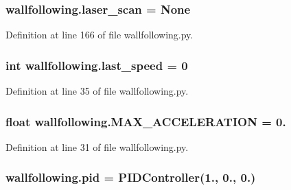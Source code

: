 \subsubsection[{\texorpdfstring{laser\+\_\+scan}{laser_scan}}]{\setlength{\rightskip}{0pt plus 5cm}wallfollowing.\+laser\+\_\+scan = None}\hypertarget{namespacewallfollowing_a35ff373c811db70d98205347a736c606}{}\label{namespacewallfollowing_a35ff373c811db70d98205347a736c606}


Definition at line 166 of file wallfollowing.\+py.

\subsubsection[{\texorpdfstring{last\+\_\+speed}{last_speed}}]{\setlength{\rightskip}{0pt plus 5cm}int wallfollowing.\+last\+\_\+speed = 0}\hypertarget{namespacewallfollowing_a9ee8d77a4629b5d8ecb2899da6e3a7fe}{}\label{namespacewallfollowing_a9ee8d77a4629b5d8ecb2899da6e3a7fe}


Definition at line 35 of file wallfollowing.\+py.

\subsubsection[{\texorpdfstring{M\+A\+X\+\_\+\+A\+C\+C\+E\+L\+E\+R\+A\+T\+I\+ON}{MAX_ACCELERATION}}]{\setlength{\rightskip}{0pt plus 5cm}float wallfollowing.\+M\+A\+X\+\_\+\+A\+C\+C\+E\+L\+E\+R\+A\+T\+I\+ON = 0.}\hypertarget{namespacewallfollowing_acc4e21a1971c33663609d022c899c167}{}\label{namespacewallfollowing_acc4e21a1971c33663609d022c899c167}


Definition at line 31 of file wallfollowing.\+py.

\subsubsection[{\texorpdfstring{pid}{pid}}]{\setlength{\rightskip}{0pt plus 5cm}wallfollowing.\+pid = {\bf P\+I\+D\+Controller}(1., 0., 0.)}\hypertarget{namespacewallfollowing_adc9f95e0b626be8ddae98a596a38e7e8}{}\label{namespacewallfollowing_adc9f95e0b626be8ddae98a596a38e7e8}


